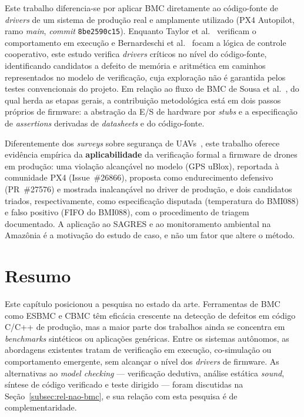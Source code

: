 Este trabalho diferencia-se por aplicar BMC diretamente ao código-fonte de
\textit{drivers} de um sistema de produção real e amplamente utilizado (PX4
Autopilot, ramo \textit{main}, \textit{commit} \texttt{8be2590c15}). Enquanto
Taylor et al.~\cite{Taylor2021} verificam o comportamento em execução e
Bernardeschi et al.~\cite{Bernardeschi2023} focam a lógica de controle
cooperativo, este estudo verifica \textit{drivers} críticos no nível do
código-fonte, identificando candidatos a defeito de memória e aritmética em
caminhos representados no modelo de verificação, cuja exploração não é garantida
pelos testes convencionais do projeto. Em relação ao
fluxo de BMC de Sousa et al.~\cite{Sousa2026}, do qual herda as etapas gerais, a
contribuição metodológica está em dois passos próprios de firmware: a abstração
da E/S de hardware por \textit{stubs} e a especificação de \textit{assertions}
derivadas de \textit{datasheets} e do código-fonte.

Diferentemente dos \textit{surveys} sobre segurança de
UAVs~\cite{Wanner2024, Siddiqi2022, Mekdad2023}, este trabalho oferece evidência
empírica da \textbf{aplicabilidade} da verificação formal a firmware de drones em
produção: uma violação alcançável no modelo (GPS uBlox), reportada à comunidade
PX4 (Issue~\#26866), proposta como endurecimento defensivo (PR~\#27576) e mostrada
inalcançável no driver de produção, e dois candidatos triados, respectivamente,
como especificação disputada (temperatura do BMI088) e falso positivo (FIFO do
BMI088), com o procedimento de triagem documentado. A aplicação ao SAGRES e ao
monitoramento ambiental na Amazônia é a motivação do estudo de caso, e não um
fator que altere o método.

\section{Resumo}
\label{sec:rel-resumo}

Este capítulo posicionou a pesquisa no estado da arte. Ferramentas de BMC como
ESBMC e CBMC têm eficácia crescente na detecção de defeitos em código C/C++ de
produção, mas a maior parte dos trabalhos ainda se concentra em \textit{benchmarks}
sintéticos ou aplicações genéricas. Entre os sistemas autônomos, as abordagens
existentes tratam de verificação em execução, co-simulação ou comportamento
emergente, sem alcançar o nível dos \textit{drivers} de firmware. As alternativas
ao \textit{model checking} --- verificação dedutiva, análise estática
\textit{sound}, síntese de código verificado e teste dirigido --- foram discutidas
na Seção~\ref{subsec:rel-nao-bmc}, e sua relação com esta pesquisa é de
complementaridade.

